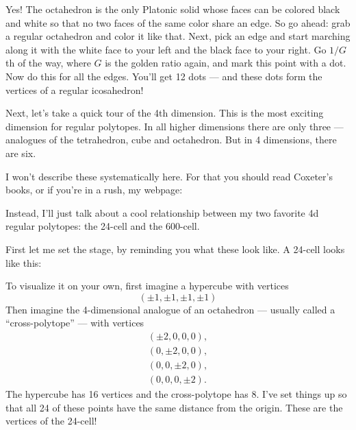 \documentclass{article}
\def\tightlist{}
\renewcommand{\texttt}[1]{%
  \begingroup
  \ttfamily
  \begingroup\lccode`~=`/\lowercase{\endgroup\def~}{/\discretionary{}{}{}}%
  \begingroup\lccode`~=`[\lowercase{\endgroup\def~}{[\discretionary{}{}{}}%
  \begingroup\lccode`~=`.\lowercase{\endgroup\def~}{.\discretionary{}{}{}}%
  \catcode`/=\active\catcode`[=\active\catcode`.=\active
  \scantokens{#1\noexpand}%
  \endgroup
}
\begin{document}
Yes! The octahedron is the only Platonic solid whose faces can be
colored black and white so that no two faces of the same color share an
edge. So go ahead: grab a regular octahedron and color it like that.
Next, pick an edge and start marching along it with the white face to
your left and the black face to your right. Go \(1/G\)th of the way,
where \(G\) is the golden ratio again, and mark this point with a dot.
Now do this for all the edges. You'll get 12 dots --- and these dots
form the vertices of a regular icosahedron!

Next, let's take a quick tour of the 4th dimension. This is the most
exciting dimension for regular polytopes. In all higher dimensions there
are only three --- analogues of the tetrahedron, cube and octahedron.
But in 4 dimensions, there are six.

I won't describe these systematically here. For that you should read
Coxeter's books, or if you're in a rush, my webpage:


Instead, I'll just talk about a cool relationship between my two
favorite 4d regular polytopes: the 24-cell and the 600-cell.

First let me set the stage, by reminding you what these look like. A
24-cell looks like this:


To visualize it on your own, first imagine a hypercube with vertices
\[(\pm1,\pm1,\pm1,\pm1)\] Then imagine the 4-dimensional analogue of an
octahedron --- usually called a ``cross-polytope'' --- with vertices \[
  \begin{gathered}
    (\pm2,0,0,0),
  \\(0,\pm2,0,0),
  \\(0,0,\pm2,0),
  \\(0,0,0,\pm2).
  \end{gathered}
\] The hypercube has 16 vertices and the cross-polytope has 8. I've set
things up so that all 24 of these points have the same distance from the
origin. These are the vertices of the 24-cell!
\end{document}
